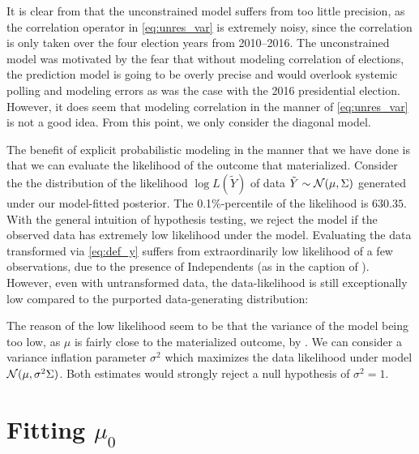 \documentclass[12pt]{article}
\begin{document}
It is clear from  that the unconstrained model suffers from too little precision, as the correlation operator in \eqref{eq:unres_var} is extremely noisy, since the correlation is only taken over the four election years from 2010--2016. The unconstrained model was motivated by the fear that without modeling correlation of elections, the prediction model is going to be overly precise and would overlook systemic polling and modeling errors as was the case with the 2016 presidential election. However, it does seem that modeling correlation in the manner of \eqref{eq:unres_var} is not a good idea. From this point, we only consider the diagonal model. 


The benefit of explicit probabilistic modeling in the manner that we have done
is that we can evaluate the likelihood of the outcome that materialized. 
Consider the the distribution of the likelihood $\log L(\tilde Y)$ of data $\tilde Y \sim \mathcal{N}(\mu, \Sigma)$ generated under our model-fitted posterior. The 0.1\%-percentile of the likelihood is $630.35$. With the general intuition of hypothesis testing, we reject the model if the observed data has extremely low likelihood under the model. Evaluating the data transformed via \eqref{eq:def_y} suffers from extraordinarily low likelihood of a few observations, due to the presence of Independents (as in the caption of ). However, even with untransformed data, the data-likelihood is still exceptionally low compared to the purported data-generating distribution:


The reason of the low likelihood seem to be that the variance of the model being too low, as $\mu$ is fairly close to the materialized outcome, by . We can consider a variance inflation parameter $\sigma^2$ which maximizes the data likelihood under model $\mathcal{N}(\mu, \sigma^2 \Sigma)$.  Both estimates would strongly reject a null hypothesis of $\sigma^2 =1$.

\section{Fitting $\mu_0$}
\label{sec:mu}
\end{document}
